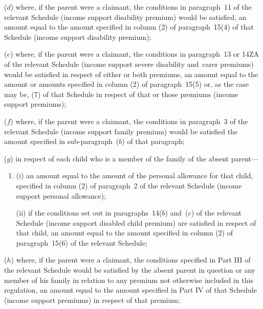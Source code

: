 \documentclass[12pt,a4paper]{article}
\begin{document}
\begin{enumerate}
($d$) where, if the parent were a claimant, the conditions in paragraph~11 of the relevant Schedule (income support disability premium) would be satisfied, an amount equal to the amount specified in column (2) of paragraph~15(4) of that Schedule (income support disability premium);

($e$) where, if the parent were a claimant, the conditions in paragraph~13 or 14ZA of the relevant Schedule (income support severe disability and~carer premiums) would be satisfied in respect of either or both premiums, an amount equal to the amount or amounts specified in column (2) of paragraph~15(5) or, as the case may be, (7) of that Schedule in respect of that or those premiums (income support premiums);

($f$) where, if the parent were a claimant, the conditions in paragraph~3 of the relevant Schedule (income support family premium) would be satisfied 
the amount specified in 
sub-paragraph~($b$) of  %
that paragraph;

($g$) in respect of each child who is a member of the family of the absent parent—
\begin{enumerate}\item[]
(i) an amount equal to the amount of the personal allowance for that child, specified in column (2) of paragraph~2 of the relevant Schedule (income support personal allowance);

(ii) if the conditions set out in paragraphs~14($b$) and~($c$) of the relevant Schedule (income support disabled child premium) are satisfied in respect of that child, an amount equal to the amount specified in column (2) of paragraph~15(6) of the relevant Schedule;
\end{enumerate}

($h$) where, if the parent were a claimant, the conditions specified in Part III of the relevant Schedule would be satisfied by the absent parent in question or any member of his family in relation to any premium not otherwise included in this regulation, an amount equal to the amount specified in Part IV of that Schedule (income support premiums) in respect of that premium;


\end{enumerate}
\end{document}

